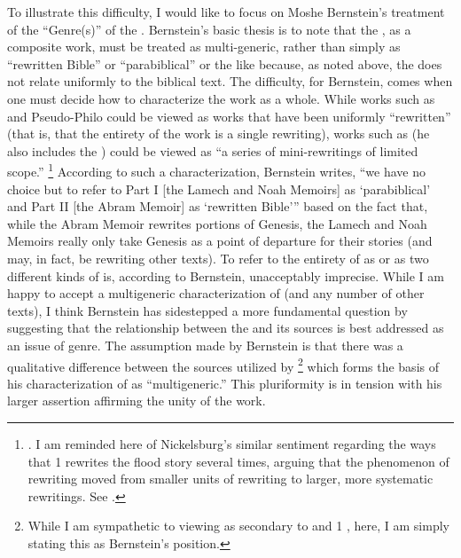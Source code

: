To illustrate this difficulty, I would like to focus on Moshe Bernstein's treatment of the ``Genre(s)'' of the \ga.\autocite[As argued in][]{bernstein_berthelot-etal2010} Bernstein's basic thesis is to note that the \ga, as a composite work, must be treated as multi-generic, rather than simply as ``rewritten Bible'' or ``parabiblical'' or the like because, as noted above, the \ga does not relate uniformly to the biblical text. The difficulty, for Bernstein, comes when one must decide how to characterize the work as a whole. While works such as \jub and Pseudo-Philo could be viewed as works that have been uniformly ``rewritten'' (that is, that the entirety of the work is a single rewriting), works such as \ga (he also includes the \templescroll) could be viewed as ``a series of mini-rewritings of limited scope.''%
%
\footnote{\cite[336]{bernstein_berthelot-etal2010}. I am reminded here of Nickelsburg's similar sentiment regarding the ways that 1 \enoch rewrites the flood story several times, arguing that the phenomenon of rewriting moved from smaller units of rewriting to larger, more systematic rewritings. See \cite[TODO: Get Pages]{nickelsburg_stone1984}.}
%
According to such a characterization, Bernstein writes, ``we have no choice but to refer to Part I [the Lamech and Noah Memoirs] as `parabiblical' and Part II [the Abram Memoir] as `rewritten Bible''' based on the fact that, while the Abram Memoir rewrites portions of Genesis, the Lamech and Noah Memoirs really only take Genesis as a point of departure for their stories (and may, in fact, be rewriting other texts).\autocite[337]{bernstein_berthelot-etal2010} To refer to the entirety of \ga as \rwb or as two different kinds of \rwb is, according to Bernstein, unacceptably imprecise. While I am happy to accept a multigeneric characterization of \ga (and any number of other texts), I think Bernstein has sidestepped a more fundamental question by suggesting that the relationship between the \ga and its sources is best addressed as an issue of genre. The assumption made by Bernstein is that there was a qualitative difference between the sources utilized by \ga\footnote{While I am sympathetic to viewing \ga as secondary to \jub and 1 \enoch, here, I am simply stating this as Bernstein's position.} which forms the basis of his characterization of \ga as ``multigeneric.'' This pluriformity is in tension with his larger assertion affirming the unity of the work. 

